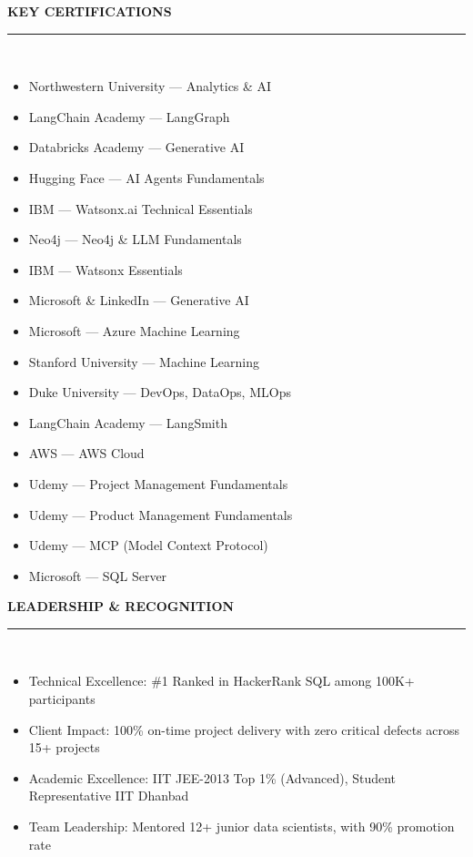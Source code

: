 \documentclass[a4paper,9pt]{article}
\newcommand{\cvsection}[2]{%
  \vspace{4pt}
  {\color{primary}\faIcon{#1}\hspace{6pt}\textbf{\fontsize{10pt}{12pt}\selectfont\uppercase{#2}}}\\[-2pt]
  \color{primary}\rule{\linewidth}{0.8pt}\\[-2pt]
  \color{textcolor}
}
\begin{document}
\begin{paracol}{2}
  \cvsection{certificate}{Key Certifications}
  \small
  \begin{itemize}
    \item Northwestern University --- Analytics \& AI
    \item LangChain Academy --- LangGraph
    \item Databricks Academy --- Generative AI
    \item Hugging Face --- AI Agents Fundamentals
    \item IBM --- Watsonx.ai Technical Essentials
    \item Neo4j --- Neo4j \& LLM Fundamentals
    \item IBM --- Watsonx Essentials
    \item Microsoft \& LinkedIn --- Generative AI
    \item Microsoft --- Azure Machine Learning
    \item Stanford University --- Machine Learning
    \item Duke University --- DevOps, DataOps, MLOps
    \item LangChain Academy --- LangSmith
    \item AWS --- AWS Cloud
    \item Udemy --- Project Management Fundamentals
    \item Udemy --- Product Management Fundamentals
    \item Udemy --- MCP (Model Context Protocol)
    \item Microsoft --- SQL Server
  \end{itemize}

  \cvsection{trophy}{Leadership \& Recognition}
  \small
  \begin{itemize}
    \item Technical Excellence: \#1 Ranked in HackerRank SQL among 100K+ participants
    \item Client Impact: 100\% on-time project delivery with zero critical defects across 15+ projects
    \item Academic Excellence: IIT JEE-2013 Top 1\% (Advanced), Student Representative IIT Dhanbad
    \item Team Leadership: Mentored 12+ junior data scientists, with 90\% promotion rate
  \end{itemize}


\end{paracol}
\end{document}
